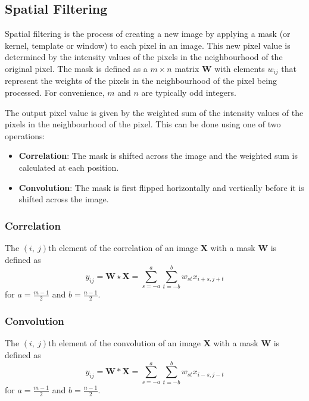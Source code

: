 \documentclass{article}
\begin{document}
\subsection{Spatial Filtering}
Spatial filtering is the process of creating a new image by applying a
mask (or kernel, template or window) to each pixel in an image. This
new pixel value is determined by the intensity values of the pixels in
the neighbourhood of the original pixel. The mask is defined as a \(m
\times n\) matrix \(\symbf{W}\) with elements \(w_{ij}\) that represent
the weights of the pixels in the neighbourhood of the pixel being
processed. For convenience, \(m\) and \(n\) are typically odd integers.

The output pixel value is given by the weighted sum of the intensity
values of the pixels in the neighbourhood of the pixel. This can be
done using one of two operations:
\begin{itemize}
    \item \textbf{Correlation}: The mask is shifted across the image
          and the weighted sum is calculated at each position.
    \item \textbf{Convolution}: The mask is first flipped horizontally
          and vertically before it is shifted across the image.
\end{itemize}
\subsubsection{Correlation}
The \(\left( i,\: j \right)\)th element of the correlation of an image
\(\symbf{X}\) with a mask \(\symbf{W}\) is defined as
\begin{equation*}
    y_{ij} = \symbf{W} \star \symbf{X} = \sum_{s = -a}^a \sum_{t = -b}^b w_{st} x_{i+s, j+t}
\end{equation*}
for \(a = \frac{m-1}{2}\) and \(b = \frac{n-1}{2}\).
\subsubsection{Convolution}
The \(\left( i,\: j \right)\)th element of the convolution of an image
\(\symbf{X}\) with a mask \(\symbf{W}\) is defined as
\begin{equation*}
    y_{ij} = \symbf{W} \ast \symbf{X} = \sum_{s = -a}^a \sum_{t = -b}^b w_{st} x_{i-s, j-t}
\end{equation*}
for \(a = \frac{m-1}{2}\) and \(b = \frac{n-1}{2}\).
\end{document}
